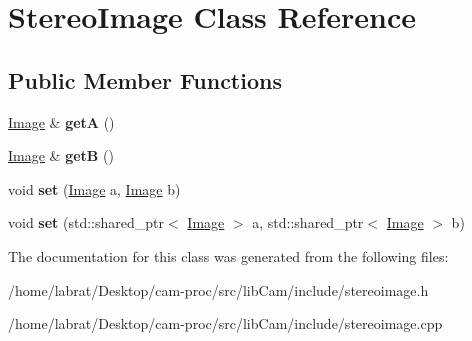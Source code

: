 \hypertarget{classStereoImage}{}\section{Stereo\+Image Class Reference}
\label{classStereoImage}
\subsection*{Public Member Functions}
\begin{DoxyCompactItemize}
\item 
\hyperlink{classImage}{Image} \& {\bfseries getA} ()\hypertarget{classStereoImage_a7dcb7577da8cdcbb7f72ed1c753787a9}{}\label{classStereoImage_a7dcb7577da8cdcbb7f72ed1c753787a9}

\item 
\hyperlink{classImage}{Image} \& {\bfseries getB} ()\hypertarget{classStereoImage_ae4463a955313432a62813a899a16c612}{}\label{classStereoImage_ae4463a955313432a62813a899a16c612}

\item 
void {\bfseries set} (\hyperlink{classImage}{Image} a, \hyperlink{classImage}{Image} b)\hypertarget{classStereoImage_aa62f7960528875e0435591e62c5b06c0}{}\label{classStereoImage_aa62f7960528875e0435591e62c5b06c0}

\item 
void {\bfseries set} (std\+::shared\+\_\+ptr$<$ \hyperlink{classImage}{Image} $>$ a, std\+::shared\+\_\+ptr$<$ \hyperlink{classImage}{Image} $>$ b)\hypertarget{classStereoImage_a8345e5c5db8ffcea7fc7c0032cf18e59}{}\label{classStereoImage_a8345e5c5db8ffcea7fc7c0032cf18e59}

\end{DoxyCompactItemize}


The documentation for this class was generated from the following files\+:\begin{DoxyCompactItemize}
\item 
/home/labrat/\+Desktop/cam-\/proc/src/lib\+Cam/include/stereoimage.\+h\item 
/home/labrat/\+Desktop/cam-\/proc/src/lib\+Cam/include/stereoimage.\+cpp\end{DoxyCompactItemize}

